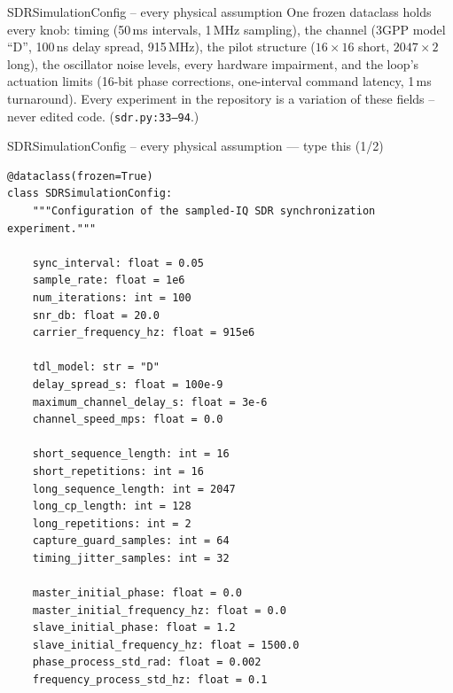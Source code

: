 \documentclass[10pt]{beamer}
\begin{document}
\begin{frame}{SDRSimulationConfig -- every physical assumption}
  One frozen dataclass holds every knob: timing (50\,ms
  intervals, 1\,MHz sampling), the channel (3GPP model ``D'',
  100\,ns delay spread, 915\,MHz), the pilot structure
  ($16\times16$ short, $2047\times2$ long), the oscillator noise
  levels, every hardware impairment, and the loop's actuation
  limits (16-bit phase corrections, one-interval command
  latency, 1\,ms turnaround). Every experiment in the
  repository is a variation of these fields -- never edited
  code. (\texttt{sdr.py:33--94}.)
\end{frame}

\begin{frame}[fragile]{SDRSimulationConfig -- every physical assumption --- type this (1/2)}
\begin{lstlisting}[basicstyle=\ttfamily\tiny]
@dataclass(frozen=True)
class SDRSimulationConfig:
    """Configuration of the sampled-IQ SDR synchronization experiment."""

    sync_interval: float = 0.05
    sample_rate: float = 1e6
    num_iterations: int = 100
    snr_db: float = 20.0
    carrier_frequency_hz: float = 915e6

    tdl_model: str = "D"
    delay_spread_s: float = 100e-9
    maximum_channel_delay_s: float = 3e-6
    channel_speed_mps: float = 0.0

    short_sequence_length: int = 16
    short_repetitions: int = 16
    long_sequence_length: int = 2047
    long_cp_length: int = 128
    long_repetitions: int = 2
    capture_guard_samples: int = 64
    timing_jitter_samples: int = 32

    master_initial_phase: float = 0.0
    master_initial_frequency_hz: float = 0.0
    slave_initial_phase: float = 1.2
    slave_initial_frequency_hz: float = 1500.0
    phase_process_std_rad: float = 0.002
    frequency_process_std_hz: float = 0.1
\end{lstlisting}
\end{frame}
\end{document}
